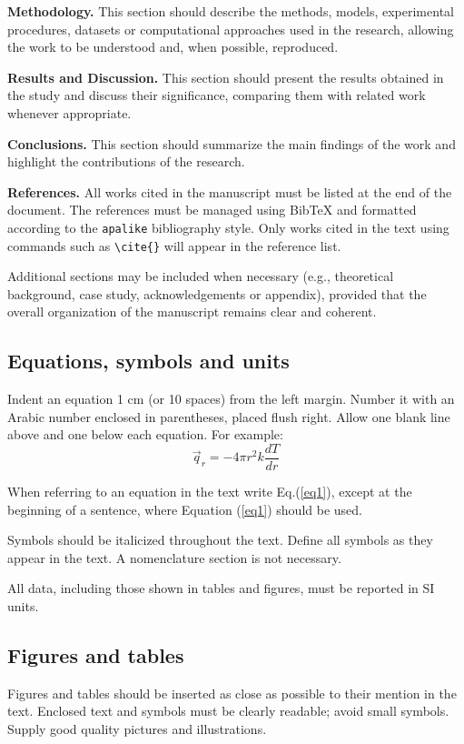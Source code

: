 \documentclass[12pt,fleqn]{article}
\begin{document}
\textbf{Methodology.} This section should describe the methods, models, experimental procedures, datasets or computational approaches used in the research, allowing the work to be understood and, when possible, reproduced.

\textbf{Results and Discussion.} This section should present the results obtained in the study and discuss their significance, comparing them with related work whenever appropriate.

\textbf{Conclusions.} This section should summarize the main findings of the work and highlight the contributions of the research.

\textbf{References.} All works cited in the manuscript must be listed at the end of the document. The references must be managed using BibTeX and formatted according to the \texttt{apalike} bibliography style. Only works cited in the text using commands such as \verb|\cite{}| will appear in the reference list.

Additional sections may be included when necessary (e.g., theoretical background, case study, acknowledgements or appendix), provided that the overall organization of the manuscript remains clear and coherent.



\subsection{Equations, symbols and units}
Indent an equation 1 cm (or 10 spaces) from the left margin. Number it with an Arabic number enclosed in parentheses, placed flush right. Allow one blank line above and one below each equation. For example:
\begin{equation}
\vec{q}_{r}=-4\pi r^{2}k\frac{dT}{dr}
\label{eq1}
\end{equation}

When referring to an equation in the text write Eq.(\ref{eq1}), except at the beginning of a sentence, where Equation (\ref{eq1}) should be used.

Symbols should be italicized throughout the text. Define all symbols as they appear in the text. A nomenclature section is not necessary.

All data, including those shown in tables and figures, must be reported in SI units.

\subsection{Figures and tables}
Figures and tables should be inserted as close as possible to their mention in the text. Enclosed text and symbols must be clearly readable; avoid small symbols. Supply good quality pictures and illustrations.
\end{document}
